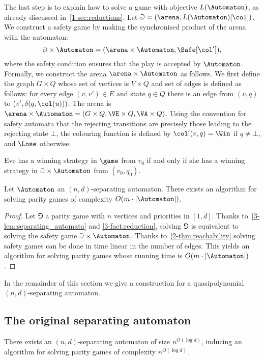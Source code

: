 The last step is to explain how to solve a game with objective $L(\Automaton)$, as already discussed in~\cref{1-sec:reductions}.
Let $\Game = (\arena, L(\Automaton)[\col])$.
We construct a safety game by making the synchronised product of the arena with the automaton:
\[
\Game \times \Automaton = (\arena \times \Automaton, \Safe[\col']),
\]
where the safety condition ensures that the play is accepted by $\Automaton$.
Formally, we construct the arena $\arena \times \Automaton$ as follows.
We first define the graph $G \times Q$ whose set of vertices is $V \times Q$ and set of edges is defined as follows:
for every edge $(v,v') \in E$ and state $q \in Q$ there is an edge from $(v,q)$ to $(v',\delta(q,\col(u)))$.
The arena is $\arena \times \Automaton = (G \times Q, \VE \times Q, \VA \times Q)$.
Using the convention for safety automata that the rejecting transitions are precisely those leading to the rejecting state $\bot$,
the colouring function is defined by $\col'(v,q) = \Win$ if $q \neq \bot$, and $\Lose$ otherwise.

\begin{fact}
\label{3-fact:reduction}
Eve has a winning strategy in $\game$ from $v_0$ if and only if
she has a winning strategy in $\Game \times \Automaton$ from $(v_0,q_0)$.
\end{fact}

\begin{theorem}
Let $\Automaton$ an $(n,d)$-separating automaton.
There exists an algorithm for solving parity games of complexity $O(m \cdot |\Automaton|)$.
\end{theorem}
\begin{proof}
Let $\Game$ a parity game with $n$ vertices and priorities in $[1,d]$.
Thanks to~\cref{3-lem:separating_automata} and \cref{3-fact:reduction}, solving $\Game$
is equivalent to solving the safety game $\Game \times \Automaton$.
Thanks to~\cref{2-thm:reachability} solving safety games can be done in time linear in the number of edges.
This yields an algorithm for solving parity games whose running time is $O(m \cdot |\Automaton|)$.
\end{proof}

In the remainder of this section we give a construction for a quasipolynomial $(n,d)$-separating automaton.

\subsection*{The original separating automaton}
\begin{theorem}
\label{3-thm:original_separating_automaton}
There exists an $(n,d)$-separating automaton of size $n^{O(\log d)}$,
inducing an algorithm for solving parity games of complexity $n^{O(\log d)}$.
\end{theorem}

